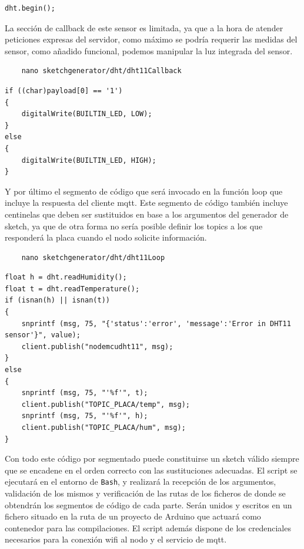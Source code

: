 \begin{verbatim}
dht.begin();
\end{verbatim}

La sección de callback de este sensor es limitada, ya que a la hora de atender peticiones expresas del servidor, como máximo se podría requerir las medidas del sensor, como añadido funcional, podemos manipular la luz integrada del sensor.

\begin{verbatim}
    nano sketchgenerator/dht/dht11Callback
\end{verbatim}

\begin{verbatim}
if ((char)payload[0] == '1')
{
    digitalWrite(BUILTIN_LED, LOW);
}
else
{
    digitalWrite(BUILTIN_LED, HIGH);
}
\end{verbatim}

Y por último el segmento de código que será invocado en la función loop que incluye la respuesta del cliente \gls{mqtt}. Este segmento de código también incluye centinelas que deben ser sustituidos en base a los argumentos del generador de \gls{sketch}, ya que de otra forma no sería posible definir los topics a los que responderá la placa cuando el nodo solicite información.
\begin{verbatim}
    nano sketchgenerator/dht/dht11Loop
\end{verbatim}

\begin{verbatim}
float h = dht.readHumidity();
float t = dht.readTemperature();
if (isnan(h) || isnan(t))
{
    snprintf (msg, 75, "{'status':'error', 'message':'Error in DHT11 sensor'}", value);
    client.publish("nodemcudht11", msg);
}
else
{
    snprintf (msg, 75, "'%f'", t);
    client.publish("TOPIC_PLACA/temp", msg);
    snprintf (msg, 75, "'%f'", h);
    client.publish("TOPIC_PLACA/hum", msg);
}
\end{verbatim}

Con todo este código por segmentado puede constituirse un \gls{sketch} válido siempre que se encadene en el orden correcto con las sustituciones adecuadas. El script se ejecutará en el entorno de \verb|Bash|, y realizará la recepción de los argumentos, validación de los mismos y verificación de las rutas de los ficheros de donde se obtendrán los segmentos de código de cada parte. Serán unidos y escritos en un fichero situado en la ruta de un proyecto de Arduino que actuará como contenedor para las compilaciones. El script además dispone de los credenciales necesarios para la conexión \gls{wifi} al nodo y el servicio de \gls{mqtt}.

